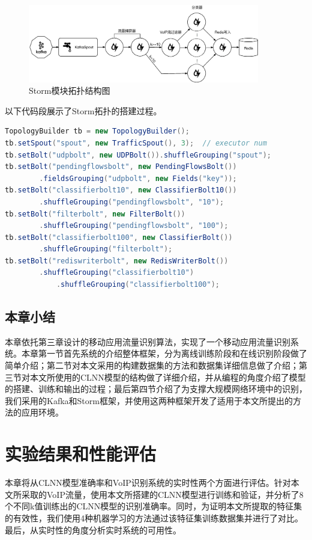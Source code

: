 \begin{figure}[htp]
\begin{center}
\includegraphics[width=0.9\textwidth]{figures/storm.eps}
\caption{Storm模块拓扑结构图}\label{fig:storm}
\end{center}
\end{figure}
以下代码段展示了Storm拓扑的搭建过程。
\begin{lstlisting}[language={Java},label={lst:storm}]  
TopologyBuilder tb = new TopologyBuilder();
tb.setSpout("spout", new TrafficSpout(), 3);  // executor num
tb.setBolt("udpbolt", new UDPBolt()).shuffleGrouping("spout");
tb.setBolt("pendingflowsbolt", new PendingFlowsBolt())
        .fieldsGrouping("udpbolt", new Fields("key"));
tb.setBolt("classifierbolt10", new ClassifierBolt10())
        .shuffleGrouping("pendingflowsbolt", "10");
tb.setBolt("filterbolt", new FilterBolt())
        .shuffleGrouping("pendingflowsbolt", "100");
tb.setBolt("classifierbolt100", new ClassifierBolt())
        .shuffleGrouping("filterbolt");
tb.setBolt("rediswriterbolt", new RedisWriterBolt())
        .shuffleGrouping("classifierbolt10")
            .shuffleGrouping("classifierbolt100");
\end{lstlisting}  

\section{本章小结}
本章依托第三章设计的移动应用流量识别算法，实现了一个移动应用流量识别系统。本章第一节首先系统的介绍整体框架，分为离线训练阶段和在线识别阶段做了简单介绍；第二节对本文采用的构建数据集的方法和数据集详细信息做了介绍；第三节对本文所使用的CLNN模型的结构做了详细介绍，并从编程的角度介绍了模型的搭建、训练和输出的过程；最后第四节介绍了为支撑大规模网络环境中的识别，我们采用的Kafka和Storm框架，并使用这两种框架开发了适用于本文所提出的方法的应用环境。



\chapter{实验结果和性能评估}
本章将从CLNN模型准确率和VoIP识别系统的实时性两个方面进行评估。针对本文所采取的VoIP流量，使用本文所搭建的CLNN模型进行训练和验证，并分析了8个不同k值训练出的CLNN模型的识别准确率。同时，为证明本文所提取的特征集的有效性，我们使用4种机器学习的方法通过该特征集训练数据集并进行了对比。最后，从实时性的角度分析实时系统的可用性。

